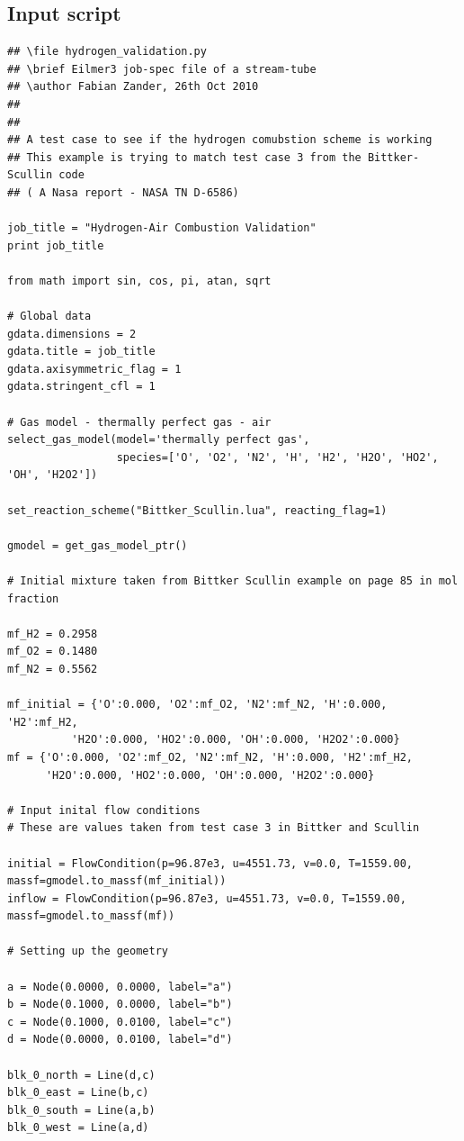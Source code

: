 \newpage
\subsection{Input script}

{\scriptsize
\begin{verbatim}
## \file hydrogen_validation.py
## \brief Eilmer3 job-spec file of a stream-tube
## \author Fabian Zander, 26th Oct 2010
##
##
## A test case to see if the hydrogen comubstion scheme is working
## This example is trying to match test case 3 from the Bittker-Scullin code 
## ( A Nasa report - NASA TN D-6586)

job_title = "Hydrogen-Air Combustion Validation"
print job_title

from math import sin, cos, pi, atan, sqrt

# Global data
gdata.dimensions = 2
gdata.title = job_title
gdata.axisymmetric_flag = 1
gdata.stringent_cfl = 1

# Gas model - thermally perfect gas - air
select_gas_model(model='thermally perfect gas', 
                 species=['O', 'O2', 'N2', 'H', 'H2', 'H2O', 'HO2', 'OH', 'H2O2'])

set_reaction_scheme("Bittker_Scullin.lua", reacting_flag=1)

gmodel = get_gas_model_ptr()

# Initial mixture taken from Bittker Scullin example on page 85 in mol fraction

mf_H2 = 0.2958
mf_O2 = 0.1480
mf_N2 = 0.5562

mf_initial = {'O':0.000, 'O2':mf_O2, 'N2':mf_N2, 'H':0.000, 'H2':mf_H2, 
	      'H2O':0.000, 'HO2':0.000, 'OH':0.000, 'H2O2':0.000}
mf = {'O':0.000, 'O2':mf_O2, 'N2':mf_N2, 'H':0.000, 'H2':mf_H2, 
      'H2O':0.000, 'HO2':0.000, 'OH':0.000, 'H2O2':0.000}

# Input inital flow conditions
# These are values taken from test case 3 in Bittker and Scullin

initial = FlowCondition(p=96.87e3, u=4551.73, v=0.0, T=1559.00, massf=gmodel.to_massf(mf_initial))
inflow = FlowCondition(p=96.87e3, u=4551.73, v=0.0, T=1559.00, massf=gmodel.to_massf(mf))

# Setting up the geometry

a = Node(0.0000, 0.0000, label="a")
b = Node(0.1000, 0.0000, label="b")
c = Node(0.1000, 0.0100, label="c")
d = Node(0.0000, 0.0100, label="d")

blk_0_north = Line(d,c)
blk_0_east = Line(b,c)
blk_0_south = Line(a,b)
blk_0_west = Line(a,d)


\end{verbatim}}

